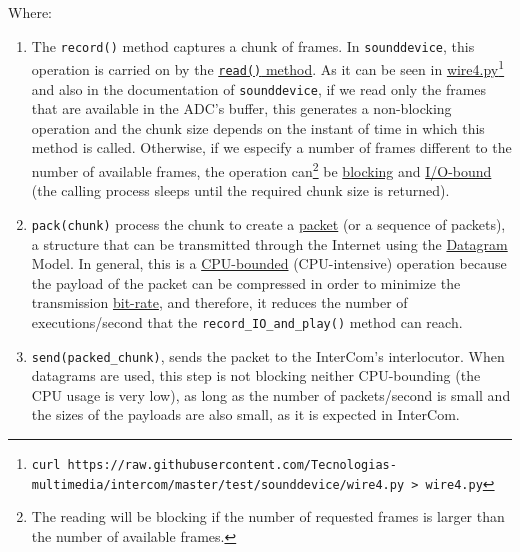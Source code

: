 Where:

\begin{enumerate}
\item The \verb|record()| method captures a chunk of frames. In
  \verb|sounddevice|, this operation is carried on by the
  \href{https://python-sounddevice.readthedocs.io/en/0.4.0/api/streams.html#sounddevice.Stream.read}{\texttt{read()}
    method}. As it can be seen in
  \href{https://raw.githubusercontent.com/Tecnologias-multimedia/intercom/master/test/sounddevice/wire4.py}{wire4.py}\footnote{
    \texttt{curl
      https://raw.githubusercontent.com/Tecnologias-multimedia/intercom/master/test/sounddevice/wire4.py
      > wire4.py}} and also in the documentation of
  \verb|sounddevice|, if we read only the frames that are available in
  the ADC's buffer, this generates a non-blocking operation and the
  chunk size depends on the instant of time in which this method is
  called. Otherwise, if we especify a number of frames different to
  the number of available frames, the operation can\footnote{The
    reading will be blocking if the number of requested frames is
    larger than the number of available frames.} be
  \href{https://python-sounddevice.readthedocs.io/en/0.4.0/api/streams.html#sounddevice.Stream.write}{blocking}
  and \href{https://en.wikipedia.org/wiki/I/O_bound}{I/O-bound} (the
  calling process sleeps until the required chunk size is returned).

\item \verb|pack(chunk)| process the chunk to create a
  \href{https://en.wikipedia.org/wiki/Network_packet}{packet} (or a
  sequence of packets), a structure that can be transmitted through
  the Internet using the
  \href{https://en.wikipedia.org/wiki/Datagram}{Datagram} Model. In
  general, this is a
  \href{https://en.wikipedia.org/wiki/CPU-bound}{CPU-bounded}
  (CPU-intensive) operation because the payload of the packet can be
  compressed in order to minimize the transmission
  \href{https://en.wikipedia.org/wiki/Bit_rate}{bit-rate}, and
  therefore, it reduces the number of executions/second that the
  \verb|record_IO_and_play()| method can reach.

\item \verb|send(packed_chunk)|, sends the packet to the
  InterCom's interlocutor. When datagrams are used, this step is
  not blocking neither CPU-bounding (the CPU usage is very low), as
  long as the number of packets/second is small and the sizes of the
  payloads are also small, as it is expected in InterCom.


\end{enumerate}
